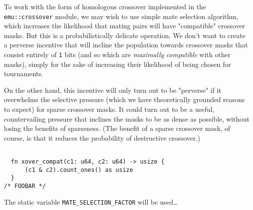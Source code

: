 \documentclass[11pt]{article}
\begin{document}
To work with the form of homologous crossover implemented in the
\texttt{emu::crossover} module, we may wish to use simple mate selection
algorithm, which increases the likelihood that mating pairs will
have "compatible" crossover masks. But this is a probabilistically
delicate operation. We don't want to create a perverse incentive
that will incline the population towards crossover masks that consist
entirely of \texttt{1} bits (and so which are \emph{maximally compatible} with other
masks), simply for the sake of increasing their likelihood of being
chosen for tournaments. 

On the other hand, this incentive will only turn out to be "perverse"
if it overwhelms the selective pressure (which we have theoretically
grounded reasons to expect) for sparse crossover masks. It could turn
out to be a useful, countervailing pressure that inclines the masks
to be as dense as possible, without losing the benefits of sparseness.
(The benefit of a sparse crossover mask, of course, is that it reduces
the probability of destructive crossover.)

\lstset{language=rust,label=org0aeb493,caption= ,captionpos=b,numbers=none}
\begin{lstlisting}

  fn xover_compat(c1: u64, c2: u64) -> usize {
      (c1 & c2).count_ones() as usize
  }
/* FOOBAR */
\end{lstlisting}

The static variable \texttt{MATE\_SELECTION\_FACTOR} will be used\ldots{}
\end{document}
